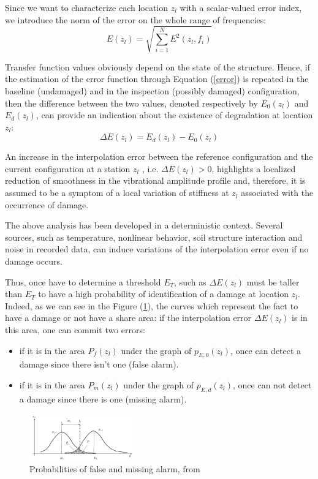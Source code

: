 \documentclass[journal]{IEEEtran}
\begin{document}
Since we want to characterize each location $z_l$ with a scalar-valued error index, we introduce the norm of the error on the whole range of
frequencies:
\begin{equation}
E(z_l) = \sqrt{  \sum\limits_{i=1}^N  E^2(z_l,f_i) }
\label{error}
\end{equation}


Transfer function values obviously depend on the state of the structure. Hence, if the estimation of the error function
through Equation (\ref{error}) is repeated in the baseline (undamaged) and in the inspection (possibly damaged) configuration, then the
difference between the two values, denoted respectively by $E_0(z_l)$ and $E_d(z_l)$, can provide an indication about the existence of
degradation at location $z_l$:
\begin{equation}
\Delta E(z_l) = E_d(z_l) - E_0(z_l)
\end{equation}

An increase in the interpolation error between the reference configuration and the current configuration at a station $z_l$ , i.e.
$ \Delta E(z_l) > 0$, highlights a localized reduction of smoothness in the vibrational amplitude profile and, therefore, it is assumed
to be a symptom of a local variation of stiffness at $z_l$ associated with the occurrence of damage.

The above analysis has been developed in a deterministic context. Several sources, such as temperature, nonlinear
behavior, soil structure interaction and noise in recorded data, can induce variations of the interpolation error even if no
damage occurs.

Thus, once have to determine a threshold $E_T$, such as $ \Delta E(z_l)$ must be taller than $E_T$ to have a high probability of identification of a damage at location $z_l$. Indeed, as we can see in the Figure (\ref{proba}), the curves which represent the fact to have a damage or not have a share area: if the interpolation error $ \Delta E(z_l)$ is in this area, one can commit two errors:
\begin{itemize}
\item if it is in the area $P_f(z_l)$ under the graph of $p_{E,0}(z_l)$, once can detect a damage since there isn't one (false alarm).
\item if it is in the area $P_m(z_l)$ under the graph of $p_{E,d}(z_l)$, once can not detect a damage since there is one (missing alarm).
\end{itemize}


\begin{figure}
  \centering
  \includegraphics[width=0.4\textwidth]{images/gaussiennes.png}
  \caption{Probabilities of false and missing alarm, from \cite{dilena2015damage}}
  \label{proba}
\end{figure}
\end{document}
